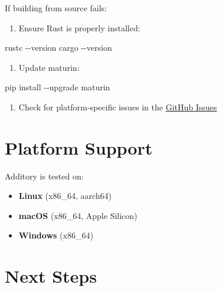\documentclass[
  letterpaper,
]{scrbook}
\newenvironment{Shaded}{\begin{snugshade}}{\end{snugshade}}
\newcommand{\AttributeTok}[1]{\textcolor[rgb]{0.40,0.45,0.13}{#1}}
\newcommand{\ExtensionTok}[1]{\textcolor[rgb]{0.00,0.23,0.31}{#1}}
\newcommand{\NormalTok}[1]{\textcolor[rgb]{0.00,0.23,0.31}{#1}}
\providecommand{\tightlist}{%
  \setlength{\itemsep}{0pt}\setlength{\parskip}{0pt}}
\begin{document}
If building from source fails:

\begin{enumerate}
\def\labelenumi{\arabic{enumi}.}
\tightlist
\item
  Ensure Rust is properly installed:
\end{enumerate}

\begin{Shaded}
\begin{Highlighting}[]
\ExtensionTok{rustc} \AttributeTok{{-}{-}version}
\ExtensionTok{cargo} \AttributeTok{{-}{-}version}
\end{Highlighting}
\end{Shaded}

\begin{enumerate}
\def\labelenumi{\arabic{enumi}.}
\setcounter{enumi}{1}
\tightlist
\item
  Update maturin:
\end{enumerate}

\begin{Shaded}
\begin{Highlighting}[]
\ExtensionTok{pip}\NormalTok{ install }\AttributeTok{{-}{-}upgrade}\NormalTok{ maturin}
\end{Highlighting}
\end{Shaded}

\begin{enumerate}
\def\labelenumi{\arabic{enumi}.}
\setcounter{enumi}{2}
\tightlist
\item
  Check for platform-specific issues in the
  \href{https://github.com/sekarkrishna/additory/issues}{GitHub Issues}
\end{enumerate}

\section{Platform Support}\label{platform-support}

Additory is tested on:

\begin{itemize}
\tightlist
\item
  \textbf{Linux} (x86\_64, aarch64)
\item
  \textbf{macOS} (x86\_64, Apple Silicon)
\item
  \textbf{Windows} (x86\_64)
\end{itemize}

\section{Next Steps}\label{next-steps-1}
\end{document}
